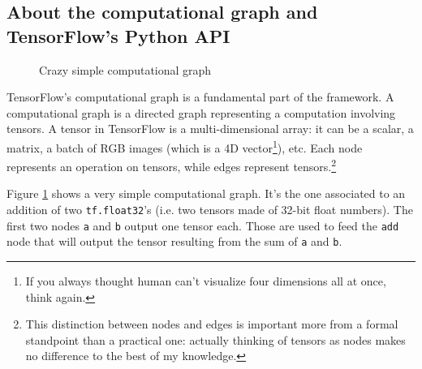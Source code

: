 \subsection{About the computational graph and TensorFlow's Python API}
\label{subsec:computational-graph}

\begin{figure}
  \centering
  \caption[]{Crazy simple computational graph}
  \label{fig:easy-graph}
\end{figure}

TensorFlow's computational graph is a fundamental part of the
framework. A computational graph is a directed graph representing a
computation involving tensors. A tensor in TensorFlow is a
multi-dimensional array: it can be a scalar, a matrix, a batch of RGB
images (which is a 4D vector\footnote{If you always thought human can't
  visualize four dimensions all at once, think again.}), etc. Each node
represents an operation on tensors, while edges represent
tensors.\footnote{This distinction between nodes and edges is important
  more from a formal standpoint than a practical one: actually thinking
  of tensors as nodes makes no difference to the best of my knowledge.}

Figure \ref{fig:easy-graph} shows a very simple computational graph.
It's the one associated to an addition of two \texttt{tf.float32}'s
(i.e. two tensors made of 32-bit float numbers). The first two nodes
\texttt{a} and \texttt{b} output one tensor each. Those are used to
feed the \texttt{add} node that will output the tensor resulting from
the sum of \texttt{a} and \texttt{b}.

